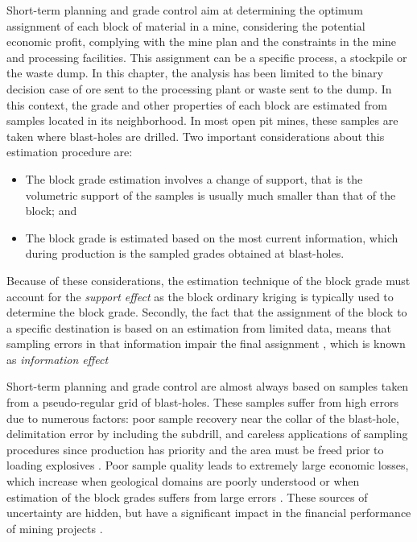 
\label{sec_intro_PII}
Short-term planning and grade control aim at determining the optimum assignment of each block of material in a mine, considering the potential economic profit, complying with the mine plan and the constraints in the mine and processing facilities. This assignment can be a specific process, a stockpile or the waste dump. In this chapter, the analysis has been limited to the binary decision case of ore sent to the processing plant or waste sent to the dump. In this context, the grade and other properties of each block are estimated from samples located in its neighborhood. In most open pit mines, these samples are taken where blast-holes are drilled. Two important considerations about this estimation procedure are:

\begin{itemize}
	\item The block grade estimation involves a change of support, that is the volumetric support of the samples is usually much smaller than that of the block; and 
	\item The block grade is estimated based on the most current information, which during production is the sampled grades obtained at blast-holes.
\end{itemize}

Because of these considerations, the estimation technique of the block grade must account for the \emph{support effect} as the block ordinary kriging is typically used to determine the block grade. Secondly, the fact that the assignment of the block to a specific destination is based on an estimation from limited data, means that sampling errors in that information impair the final assignment \cite[p.~7]{Chiles2012} \citep{Abzalov2010}, which is known as \emph{information effect} \cite[p.~442]{Chiles2012}

Short-term planning and grade control are almost always based on samples taken from a pseudo-regular grid of blast-holes. These samples suffer from high 
errors due to numerous factors: poor sample recovery near the collar of the blast-hole, delimitation error by including the subdrill, and careless applications of sampling procedures since production has priority and the area must be freed prior to loading explosives \citep{Franc1983,Pitard1993,Ortiz2012}. Poor sample quality leads to extremely large economic losses, which increase when geological domains are poorly understood or when estimation of the block grades suffers from large errors \citep{Magri2000}. These sources of uncertainty are hidden, but have a significant impact in the financial performance of mining projects \citep{Magri2010,Magri2011,Ortiz_2004_a}.

